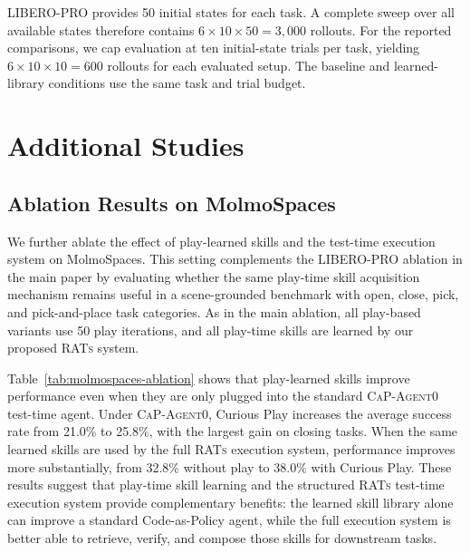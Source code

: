 \documentclass{llmxive}
\begin{document}
LIBERO-PRO provides 50 initial states for each task. A complete sweep over all
available states therefore contains $6 \times 10 \times 50 = 3{,}000$
rollouts. For the reported comparisons, we cap evaluation at ten
initial-state trials per task, yielding $6 \times 10 \times 10 = 600$ rollouts
for each evaluated setup. The baseline and learned-library conditions use the
same task and trial budget.




    










\section{Additional Studies}
\label{sec:appendix_additional_studies}

\subsection{Ablation Results on MolmoSpaces}

We further ablate the effect of play-learned skills and the test-time execution system on
MolmoSpaces. This setting complements the LIBERO-PRO ablation in the main paper by evaluating
whether the same play-time skill acquisition mechanism remains useful in a scene-grounded
benchmark with open, close, pick, and pick-and-place task categories. As in the main ablation, all
play-based variants use 50 play iterations, and all play-time skills are learned by our proposed
\textsc{RATs} system.

Table~\ref{tab:molmospaces-ablation} shows that play-learned skills improve performance even when
they are only plugged into the standard \textsc{CaP-Agent0} test-time agent. Under \textsc{CaP-Agent0},
Curious Play increases the average success rate from 21.0\% to 25.8\%, with the largest gain on
closing tasks. When the same learned skills are used by the full \textsc{RATs} execution system,
performance improves more substantially, from 32.8\% without play to 38.0\% with Curious Play.
These results suggest that play-time skill learning and the structured \textsc{RATs} test-time
execution system provide complementary benefits: the learned skill library alone can improve a
standard Code-as-Policy agent, while the full execution system is better able to retrieve, verify, and
compose those skills for downstream tasks.
\end{document}
